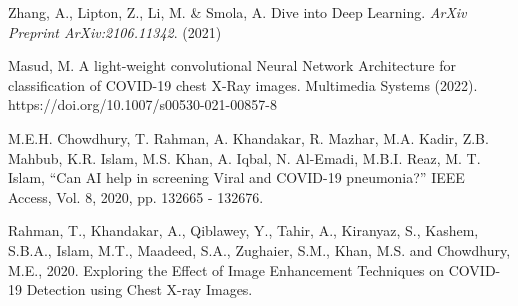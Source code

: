 \begin{thebibliography}{}

Zhang, A., Lipton, Z., Li, M. \& Smola, A. Dive into Deep Learning. {\em ArXiv Preprint ArXiv:2106.11342}. (2021)

 Masud, M. A light-weight convolutional Neural Network Architecture for classification of COVID-19 chest X-Ray images. Multimedia Systems (2022). https://doi.org/10.1007/s00530-021-00857-8

M.E.H. Chowdhury, T. Rahman, A. Khandakar, R. Mazhar, M.A. Kadir, Z.B. Mahbub, K.R. Islam, M.S. Khan, A. Iqbal, N. Al-Emadi, M.B.I. Reaz, M. T. Islam, “Can AI help in screening Viral and COVID-19 pneumonia?” IEEE Access, Vol. 8, 2020, pp. 132665 - 132676.

Rahman, T., Khandakar, A., Qiblawey, Y., Tahir, A., Kiranyaz, S., Kashem, S.B.A., Islam, M.T., Maadeed, S.A., Zughaier, S.M., Khan, M.S. and Chowdhury, M.E., 2020. Exploring the Effect of Image Enhancement Techniques on COVID-19 Detection using Chest X-ray Images.

\end{thebibliography}
